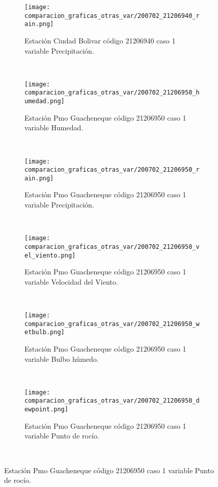 \begin{figure}[H]
\centering
\begin{subfigure}[normla]{0.4\textwidth}
\caption{Estación Ciudad Bolivar código 21206940 caso 1 variable Precipitación.}
\texttt{[image: comparacion\_graficas\_otras\_var/200702\_21206940\_rain.png]}
\end{subfigure}
~
\begin{subfigure}[normla]{0.4\textwidth}
\caption{Estación Pmo Guacheneque código 21206950 caso 1 variable Humedad.}
\texttt{[image: comparacion\_graficas\_otras\_var/200702\_21206950\_humedad.png]}
\end{subfigure}
~
\begin{subfigure}[normla]{0.4\textwidth}
\caption{Estación Pmo Guacheneque código 21206950 caso 1 variable Precipitación.}
\texttt{[image: comparacion\_graficas\_otras\_var/200702\_21206950\_rain.png]}
\end{subfigure}
~
\begin{subfigure}[normla]{0.4\textwidth}
\caption{Estación Pmo Guacheneque código 21206950 caso 1 variable Velocidad del Viento.}
\texttt{[image: comparacion\_graficas\_otras\_var/200702\_21206950\_vel\_viento.png]}
\end{subfigure}
~
\begin{subfigure}[normla]{0.4\textwidth}
\caption{Estación Pmo Guacheneque código 21206950 caso 1 variable Bulbo húmedo.}
\texttt{[image: comparacion\_graficas\_otras\_var/200702\_21206950\_wetbulb.png]}
\end{subfigure}
~
\begin{subfigure}[normla]{0.4\textwidth}
\caption{Estación Pmo Guacheneque código 21206950 caso 1 variable Punto de rocío.}
\texttt{[image: comparacion\_graficas\_otras\_var/200702\_21206950\_dewpoint.png]}
\end{subfigure}
~
\end{figure}
           
